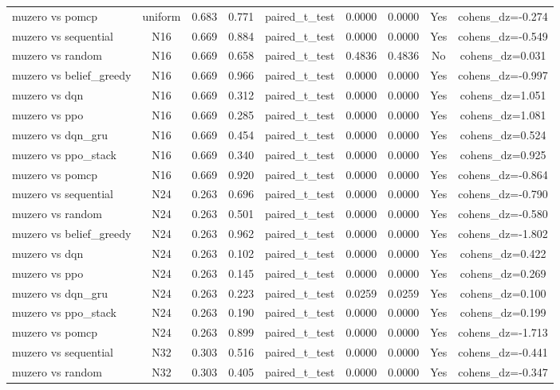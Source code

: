 \begin{table}[htbp]
\begin{tabular}{lcccccccc}
muzero vs pomcp & uniform & 0.683 & 0.771 & paired_t_test & 0.0000 & 0.0000 & Yes & cohens_dz=-0.274 \\
muzero vs sequential & N16 & 0.669 & 0.884 & paired_t_test & 0.0000 & 0.0000 & Yes & cohens_dz=-0.549 \\
muzero vs random & N16 & 0.669 & 0.658 & paired_t_test & 0.4836 & 0.4836 & No & cohens_dz=0.031 \\
muzero vs belief_greedy & N16 & 0.669 & 0.966 & paired_t_test & 0.0000 & 0.0000 & Yes & cohens_dz=-0.997 \\
muzero vs dqn & N16 & 0.669 & 0.312 & paired_t_test & 0.0000 & 0.0000 & Yes & cohens_dz=1.051 \\
muzero vs ppo & N16 & 0.669 & 0.285 & paired_t_test & 0.0000 & 0.0000 & Yes & cohens_dz=1.081 \\
muzero vs dqn_gru & N16 & 0.669 & 0.454 & paired_t_test & 0.0000 & 0.0000 & Yes & cohens_dz=0.524 \\
muzero vs ppo_stack & N16 & 0.669 & 0.340 & paired_t_test & 0.0000 & 0.0000 & Yes & cohens_dz=0.925 \\
muzero vs pomcp & N16 & 0.669 & 0.920 & paired_t_test & 0.0000 & 0.0000 & Yes & cohens_dz=-0.864 \\
muzero vs sequential & N24 & 0.263 & 0.696 & paired_t_test & 0.0000 & 0.0000 & Yes & cohens_dz=-0.790 \\
muzero vs random & N24 & 0.263 & 0.501 & paired_t_test & 0.0000 & 0.0000 & Yes & cohens_dz=-0.580 \\
muzero vs belief_greedy & N24 & 0.263 & 0.962 & paired_t_test & 0.0000 & 0.0000 & Yes & cohens_dz=-1.802 \\
muzero vs dqn & N24 & 0.263 & 0.102 & paired_t_test & 0.0000 & 0.0000 & Yes & cohens_dz=0.422 \\
muzero vs ppo & N24 & 0.263 & 0.145 & paired_t_test & 0.0000 & 0.0000 & Yes & cohens_dz=0.269 \\
muzero vs dqn_gru & N24 & 0.263 & 0.223 & paired_t_test & 0.0259 & 0.0259 & Yes & cohens_dz=0.100 \\
muzero vs ppo_stack & N24 & 0.263 & 0.190 & paired_t_test & 0.0000 & 0.0000 & Yes & cohens_dz=0.199 \\
muzero vs pomcp & N24 & 0.263 & 0.899 & paired_t_test & 0.0000 & 0.0000 & Yes & cohens_dz=-1.713 \\
muzero vs sequential & N32 & 0.303 & 0.516 & paired_t_test & 0.0000 & 0.0000 & Yes & cohens_dz=-0.441 \\
muzero vs random & N32 & 0.303 & 0.405 & paired_t_test & 0.0000 & 0.0000 & Yes & cohens_dz=-0.347 \\

\end{tabular}
\end{table}
